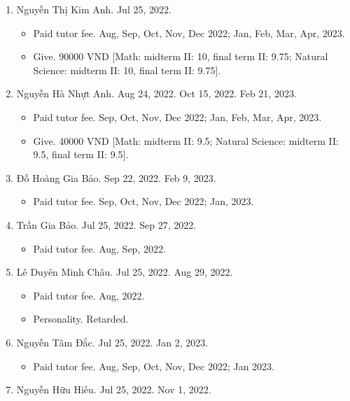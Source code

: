 \documentclass{article}
\begin{document}
\begin{enumerate}
	\item {\sc Nguyễn Thị Kim Anh.} {\sf[In]} Jul 25, 2022.
	\begin{itemize}
		\item {\sf Paid tutor fee.} Aug, Sep, Oct, Nov, Dec 2022; Jan, Feb, Mar, Apr, 2023.
		\item {\sf Give.} 90000 VND [Math: midterm II: 10, final term II: 9.75; Natural Science: midterm II: 10, final term II: 9.75].
	\end{itemize}
	\item {\sc Nguyễn Hà Nhựt Anh.} {\sf[In]} Aug 24, 2022. {\sf[Re-In]} Oct 15, 2022. Feb 21, 2023.
	\begin{itemize}
		\item {\sf Paid tutor fee.} Sep, Oct, Nov, Dec 2022; Jan, Feb, Mar, Apr, 2023.
		\item {\sf Give.} 40000 VND [Math: midterm II: 9.5; Natural Science: midterm II: 9.5, final term II: 9.5].
	\end{itemize}
	\item {\sc Đỗ Hoàng Gia Bảo.} {\sf[In]} Sep 22, 2022. {\sf[Out]} Feb 9, 2023.
	\begin{itemize}
		\item {\sf Paid tutor fee.} Sep, Oct, Nov, Dec 2022; Jan, 2023.
	\end{itemize}
	\item {\sc Trần Gia Bảo.} {\sf[In]} Jul 25, 2022. {\sf[Out]} Sep 27, 2022.
	\begin{itemize}
		\item {\sf Paid tutor fee.} Aug, Sep, 2022.
	\end{itemize}
	\item {\sc Lê Duyên Minh Châu.} {\sf[In]} Jul 25, 2022. {\sf[Out]} Aug 29, 2022.
	\begin{itemize}
		\item {\sf Paid tutor fee.} Aug, 2022.
		\item {\sf Personality.} Retarded.
	\end{itemize}
	\item {\sc Nguyễn Tâm Đắc.} {\sf[In]} Jul 25, 2022. {\sf[Out]} Jan 2, 2023.
	\begin{itemize}
		\item {\sf Paid tutor fee.} Aug, Sep, Oct, Nov, Dec 2022; Jan 2023.
	\end{itemize}
	\item {\sc Nguyễn Hữu Hiếu.} {\sf[In]} Jul 25, 2022. {\sf[Out]} Nov 1, 2022.
	\begin{itemize}

\end{itemize}
\end{enumerate}
\end{document}
